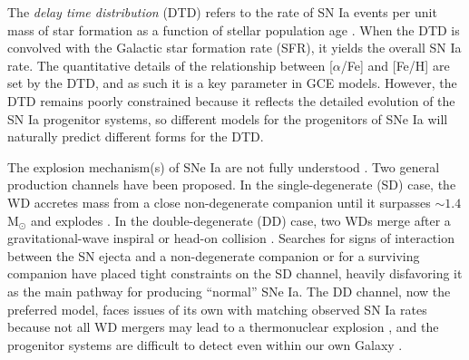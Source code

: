 \documentclass[twocolumn,twocolappendix,linenumbers,trackchanges]{aastex631}
\newcommand{\aFe}{[$\alpha$/Fe]\xspace}
\begin{document}
The {\it delay time distribution} (DTD) refers to the rate of SN Ia events per unit mass of star formation as a function of stellar population age
\citep[for a review, see Section 3.5 of][]{Maoz2014-Review}.
When the DTD is convolved with the Galactic star formation rate (SFR), it yields the overall SN Ia rate. 
The quantitative details of the relationship between \aFe and [Fe/H] are set by the DTD, and as such it is a key parameter in GCE models.
However, the DTD remains poorly constrained because it reflects the detailed evolution of the SN Ia progenitor systems, so different models for the progenitors of SNe Ia will naturally predict different forms for the DTD.

The explosion mechanism(s) of SNe Ia are not fully understood \citep[for reviews, see][]{Maoz2014-Review,Livio2018-ProgenitorReview,Ruiter2020-ProgenitorReview}. Two general production channels have been proposed. In the single-degenerate (SD) case, the WD accretes mass from a close non-degenerate companion until it surpasses $\sim1.4$ M$_\odot$ and explodes \citep{Whelan1973-SDModel,Nomoto1982-SDModel,Yoon2003-SDModel}. In the double-degenerate (DD) case, two WDs merge after a gravitational-wave inspiral \citep{Iben1984-IaBinary,Webbink1984-DDModel,Pakmor2012-WDMerger} or head-on collision \citep{Benz1989-CollisionalDD,Thompson2011-CollisionalDD}. Searches for signs of interaction between the SN ejecta and a non-degenerate companion \citep[e.g.,][]{Panagia2006-RadioEmission,Chomiuk2016-RadioEmission,Fausnaugh2019-EarlyIaLightCurves,Tucker2020-SNeIaSpectra,Dubay2022-SNeIaCSM} or for a surviving companion \citep[e.g.,][]{Schaefer2012-ExCompanionSNR,Do2021-Progenitor1972E,Tucker2023-SN2011fe} have placed tight constraints on the SD channel, heavily disfavoring it as the main pathway for producing ``normal'' SNe Ia. The DD channel, now the preferred model, faces issues of its own with matching observed SN Ia rates because not all WD mergers may lead to a thermonuclear explosion \citep[e.g.,][]{NomotoIben1985-DDMergers,SaioNomoto1998-DDMergers,Shen2012-DDMergers}, and the progenitor systems are difficult to detect even within our own Galaxy \citep{RebassaMansergas2019-WhereAreDDProgenitors}.
\end{document}
